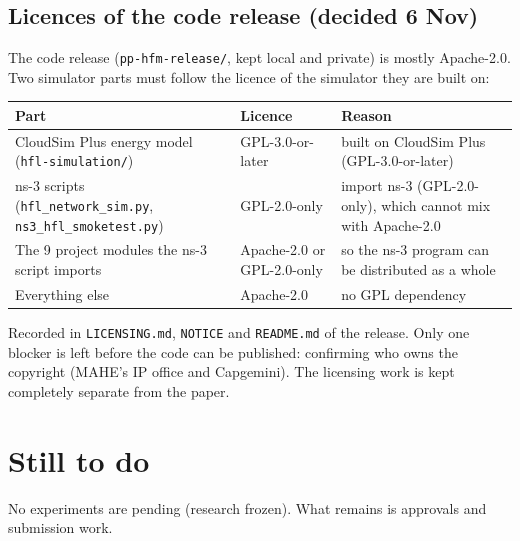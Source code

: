 \documentclass[11pt,a4paper]{article}
\begin{document}
\subsection{Licences of the code release (decided 6 Nov)}
The code release (\texttt{pp-hfm-release/}, kept local and private) is mostly
Apache-2.0. Two simulator parts must follow the licence of the simulator they
are built on:
\begin{center}
\small
\begin{tabular}{P{0.42\textwidth} P{0.2\textwidth} P{0.3\textwidth}}
\toprule
Part & Licence & Reason \\
\midrule
CloudSim Plus energy model (\texttt{hfl-simulation/}) & GPL-3.0-or-later & built on CloudSim Plus (GPL-3.0-or-later) \\
ns-3 scripts (\texttt{hfl\_network\_sim.py}, \texttt{ns3\_hfl\_smoketest.py}) & GPL-2.0-only & import ns-3 (GPL-2.0-only), which cannot mix with Apache-2.0 \\
The 9 project modules the ns-3 script imports & Apache-2.0 or GPL-2.0-only & so the ns-3 program can be distributed as a whole \\
Everything else & Apache-2.0 & no GPL dependency \\
\bottomrule
\end{tabular}
\end{center}
Recorded in \texttt{LICENSING.md}, \texttt{NOTICE} and \texttt{README.md} of the
release. Only one blocker is left before the code can be published: confirming
who owns the copyright (MAHE's IP office and Capgemini). The licensing work is
kept completely separate from the paper.

\section{Still to do}

No experiments are pending (research frozen). What remains is approvals and
submission work.
\end{document}
